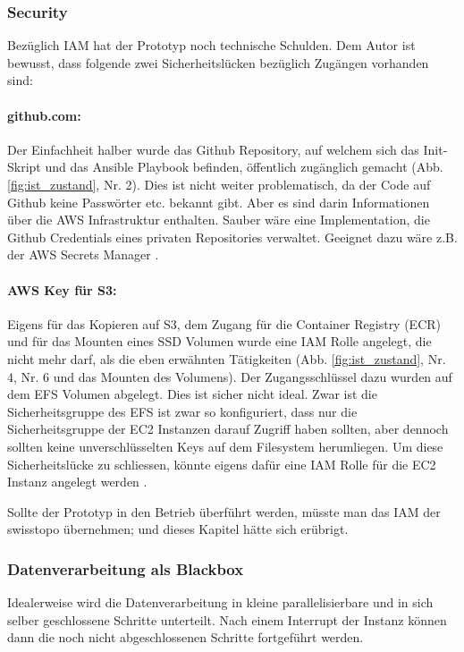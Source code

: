 \subsubsection{Security}
Bezüglich IAM hat der Prototyp noch technische Schulden. Dem Autor ist bewusst, dass folgende zwei Sicherheitslücken bezüglich Zugängen vorhanden sind:
\paragraph{github.com:} Der Einfachheit halber wurde das Github Repository, auf welchem sich das Init-Skript und das Ansible Playbook befinden, öffentlich zugänglich gemacht (Abb. \ref{fig:ist_zustand}, Nr. 2). Dies ist nicht weiter problematisch, da der Code auf Github keine Passwörter etc. bekannt gibt. Aber es sind darin Informationen über die AWS Infrastruktur enthalten. Sauber wäre eine Implementation, die Github Credentials eines privaten Repositories verwaltet. Geeignet dazu wäre z.B. der AWS Secrets Manager \cite{Secrets2020}.
\paragraph{AWS Key für S3:} Eigens für das Kopieren auf S3, dem Zugang für die Container Registry (ECR) und für das Mounten eines SSD Volumen wurde eine IAM Rolle angelegt, die nicht mehr darf, als die eben erwähnten Tätigkeiten (Abb. \ref{fig:ist_zustand}, Nr. 4, Nr. 6 und das Mounten des Volumens). Der Zugangsschlüssel dazu wurden auf dem EFS Volumen abgelegt. Dies ist sicher nicht ideal. Zwar ist die Sicherheitsgruppe des EFS ist zwar so konfiguriert, dass nur die Sicherheitsgruppe der EC2 Instanzen darauf Zugriff haben sollten, aber dennoch sollten keine unverschlüsselten Keys auf dem Filesystem herumliegen.
Um diese Sicherheitslücke zu schliessen, könnte eigens dafür eine IAM Rolle für die EC2 Instanz angelegt werden \cite{IAMEC2}.

Sollte der Prototyp in den Betrieb überführt werden, müsste man das IAM der swisstopo übernehmen; und dieses Kapitel hätte sich erübrigt.

\subsubsection{Datenverarbeitung als Blackbox}
Idealerweise wird die Datenverarbeitung in kleine parallelisierbare und in sich selber geschlossene Schritte unterteilt. Nach einem Interrupt der Instanz können dann die noch nicht abgeschlossenen Schritte fortgeführt werden. 

